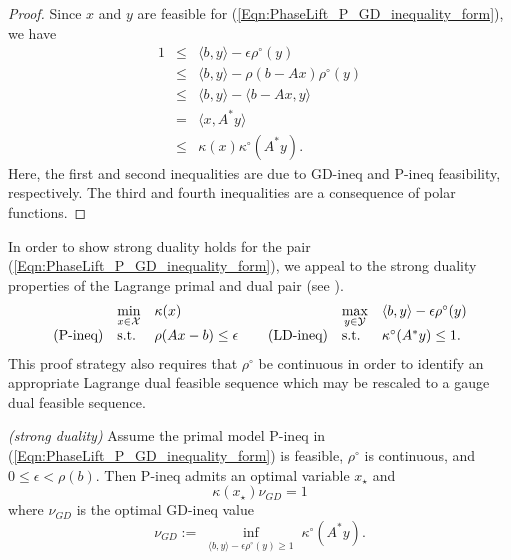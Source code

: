 \begin{enumerate}
\begin{prop}
\end{prop}
\begin{proof}
Since $x$ and $y$ are feasible for (\ref{Eqn:PhaseLift_P_GD_inequality_form}), we have
\begin{equation} 		\label{Eqn:weak_duality_inequalities}
\begin{array}{rcl}
1 
	&	\leq 	&	\langle b, y \rangle - \epsilon \rho^\circ(y)	\\
	&	\leq 	&	\langle b, y \rangle - \rho(b - Ax) \rho^\circ(y) \\
	&	\leq 	&	\langle b, y \rangle - \langle b - Ax, y \rangle \\
	&	=		&	\langle x, A^*y \rangle \\	
	&	\leq 	&	\kappa(x) \kappa^\circ(A^*y).
\end{array}
\end{equation}
Here, the first and second inequalities are due to GD-ineq and P-ineq feasibility, respectively.  The third and fourth inequalities are a consequence of polar functions.
\end{proof}




In order to show strong duality holds for the pair (\ref{Eqn:PhaseLift_P_GD_inequality_form}), we appeal to the strong duality properties of the Lagrange primal and dual pair (see \cite[Section 28]{rockafellar1970convex}).
\begin{equation}			\label{Eqn:PhaseLift_P_GD_ineq_Lagrange_dual}
\begin{array}{lllllll}
	&	\min\limits_{\substack{x \in {\mathcal X}}}
		&	\kappa(x)
			&
				&	\max\limits_{\substack{y \in {\mathcal Y}}}
					&	\langle b, y \rangle - \epsilon \rho^\circ(y)
						\\
\textnormal{(P-ineq)}
	&	\textnormal{s.t.}
		& 	\rho(Ax-b) \leq \epsilon
			&	\hspace{0.4cm} 	\textnormal{(LD-ineq)}
				&	\textnormal{s.t.}
					&	\kappa^\circ(A^*y)  \leq 1.
\end{array}
\end{equation}
This proof strategy also requires that $\rho^\circ$ be continuous in order to identify an appropriate Lagrange dual feasible sequence which may be rescaled to a gauge dual feasible sequence.

\begin{prop} \label{Prop:strong_duality}
\emph{(strong duality)}
Assume the primal model P-ineq in (\ref{Eqn:PhaseLift_P_GD_inequality_form}) is feasible, $\rho^\circ$ is continuous, and $0 \leq \epsilon < \rho(b)$.  Then P-ineq admits an optimal variable $x_\star$ and
\begin{equation} 			\label{Eqn:strong_duality_1}
\kappa(x_\star) \nu_{GD} = 1
\end{equation}
where $\nu_{GD}$ is the optimal GD-ineq value
\begin{equation}
\nu_{GD} := \inf\limits_{\substack{ \langle b, y \rangle - \epsilon \rho^\circ(y) \geq 1}} \kappa^\circ(A^*y).
\end{equation}


\end{prop}
\end{enumerate}
